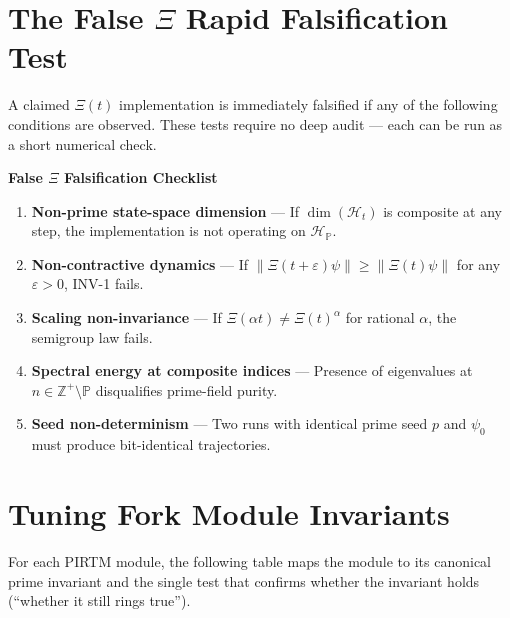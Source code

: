 \documentclass[12pt,letterpaper]{article}
\theoremstyle{definition}
\theoremstyle{remark}
\begin{document}
\section{The False $\Xi$ Rapid Falsification Test}

A claimed $\Xi(t)$ implementation is immediately falsified if any of the following conditions are observed. These tests require no deep audit --- each can be run as a short numerical check.

\begin{mdframed}[backgroundcolor=invariantbg,linecolor=primeviolet,linewidth=1pt]
\textbf{False $\Xi$ Falsification Checklist}
\begin{enumerate}[noitemsep]
\item \textbf{Non-prime state-space dimension} --- If $\dim(\mathcal{H}_t)$ is composite at any step, the implementation is not operating on $\mathcal{H}_\mathbb{P}$.
\item \textbf{Non-contractive dynamics} --- If $\|\Xi(t+\varepsilon)\psi\| \geq \|\Xi(t)\psi\|$ for any $\varepsilon > 0$, INV-1 fails.
\item \textbf{Scaling non-invariance} --- If $\Xi(\alpha t) \neq \Xi(t)^\alpha$ for rational $\alpha$, the semigroup law fails.
\item \textbf{Spectral energy at composite indices} --- Presence of eigenvalues at $n \in \mathbb{Z}^+ \setminus \mathbb{P}$ disqualifies prime-field purity.
\item \textbf{Seed non-determinism} --- Two runs with identical prime seed $p$ and $\psi_0$ must produce bit-identical trajectories.
\end{enumerate}
\end{mdframed}

\section{Tuning Fork Module Invariants}

For each PIRTM module, the following table maps the module to its canonical prime invariant and the single test that confirms whether the invariant holds (``whether it still rings true'').
\end{document}

